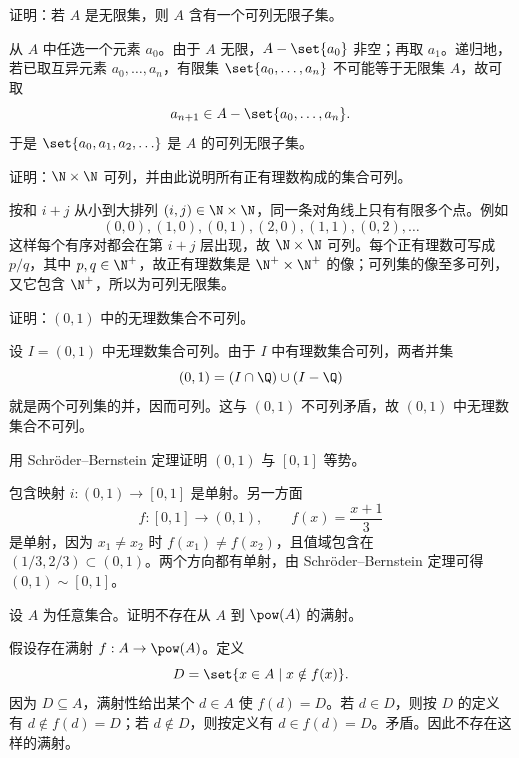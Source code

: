 \begin{exercise}[level=advanced]
证明：若 $A$ 是无限集，则 $A$ 含有一个可列无限子集。
\begin{solution}
从 $A$ 中任选一个元素 $a_0$。由于 $A$ 无限，$A-\set{a_0}$ 非空；再取 $a_1$。递归地，若已取互异元素 $a_0,\ldots,a_n$，有限集 $\set{a_0,\ldots,a_n}$ 不可能等于无限集 $A$，故可取
  \[
  a_{n+1}\in A-\set{a_0,\ldots,a_n}.
  \]
  于是 $\set{a_0,a_1,a_2,\ldots}$ 是 $A$ 的可列无限子集。
\end{solution}
\end{exercise}

\begin{exercise}[level=advanced]
证明：$\N\times\N$ 可列，并由此说明所有正有理数构成的集合可列。
\begin{solution}
按和 $i+j$ 从小到大排列 $(i,j)\in\N\times\N$，同一条对角线上只有有限多个点。例如
  \[
  (0,0),(1,0),(0,1),(2,0),(1,1),(0,2),\ldots
  \]
  这样每个有序对都会在第 $i+j$ 层出现，故 $\N\times\N$ 可列。每个正有理数可写成 $p/q$，其中 $p,q\in\N^+$，故正有理数集是 $\N^+\times\N^+$ 的像；可列集的像至多可列，又它包含 $\N^+$，所以为可列无限集。
\end{solution}
\end{exercise}

\begin{exercise}[level=advanced]
证明：$(0,1)$ 中的无理数集合不可列。
\begin{solution}
设 $I=(0,1)$ 中无理数集合可列。由于 $I$ 中有理数集合可列，两者并集
  \[
  (0,1)=(I\cap\Q)\cup(I-\Q)
  \]
  就是两个可列集的并，因而可列。这与 $(0,1)$ 不可列矛盾，故 $(0,1)$ 中无理数集合不可列。
\end{solution}
\end{exercise}

\begin{exercise}[level=advanced]
用 Schröder--Bernstein 定理证明 $(0,1)$ 与 $[0,1]$ 等势。
\begin{solution}
包含映射 $i:(0,1)\to[0,1]$ 是单射。另一方面
  \[
  f:[0,1]\to(0,1),\qquad f(x)=\frac{x+1}{3}
  \]
  是单射，因为 $x_1\ne x_2$ 时 $f(x_1)\ne f(x_2)$，且值域包含在 $(1/3,2/3)\subset(0,1)$。两个方向都有单射，由 Schröder--Bernstein 定理可得 $(0,1)\sim[0,1]$。
\end{solution}
\end{exercise}

\begin{exercise}[level=advanced]
设 $A$ 为任意集合。证明不存在从 $A$ 到 $\pow(A)$ 的满射。
\begin{solution}
假设存在满射 $f:A\to\pow(A)$。定义
  \[
  D=\set{x\in A\mid x\notin f(x)}.
  \]
  因为 $D\subseteq A$，满射性给出某个 $d\in A$ 使 $f(d)=D$。若 $d\in D$，则按 $D$ 的定义有 $d\notin f(d)=D$；若 $d\notin D$，则按定义有 $d\in f(d)=D$。矛盾。因此不存在这样的满射。
\end{solution}
\end{exercise}

